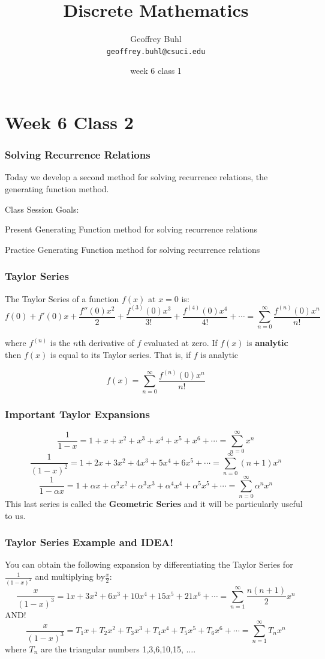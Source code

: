 \documentclass{beamer}
\title{Discrete Mathematics}
\author[Geoffrey Buhl]{Geoffrey Buhl \\ \texttt{geoffrey.buhl@csuci.edu}}
\institute[CSUCI]{California State University Channel Islands}
\date{week 6 class 1}
\newenvironment{packed_enum}{
\begin{enumerate}
  \setlength{\itemsep}{1pt}
  \setlength{\parskip}{0pt}
  \setlength{\parsep}{0pt}
}{\end{enumerate}}
\begin{document}


\section{Week 6 Class 2}

\frame
{
  \frametitle{Solving Recurrence Relations}

Today we develop a second method for solving recurrence relations, the generating function method.

\vfill
Class Session Goals:
\begin{packed_enum}
\item Present Generating Function method for solving recurrence relations
\item Practice Generating Function method for solving recurrence relations
\end{packed_enum}
\vfill
}

\frame
{
  \frametitle{Taylor Series}

The Taylor Series of a function $f(x)$ at $x=0$ is:\\

$$f(0)+f'(0)x+\frac{f''(0)x^2}{2}+\frac{f^{(3)}(0)x^3}{3!}+\frac{f^{(4)}(0)x^4}{4!}+ \cdots=\sum^{\infty}_{n=0}\frac{f^{(n)}(0)x^n}{n!}$$

where $f^{(n)}$ is the $n$th derivative of $f$ evaluated at zero.  If $f(x)$ is {\bf analytic} then $f(x)$ is equal to its Taylor series. That is, if $f$ is analytic

$$f(x)=\sum^{\infty}_{n=0}\frac{f^{(n)}(0)x^n}{n!}$$
}

\frame
{
  \frametitle{Important Taylor Expansions}


$$\frac{1}{1-x}=1+x+x^2+x^3+x^4+x^5+x^6+ \cdots=\sum_{n=0}^{\infty}x^n$$
$$\frac{1}{(1-x)^2}=1+2x+3x^2+4x^3+5x^4+6x^5+ \cdots=\sum_{n=0}^{\infty}(n+1)x^n$$
$$\frac{1}{1-\alpha x}=1+\alpha x+\alpha^2x^2+\alpha^3x^3+\alpha^4x^4+\alpha^5x^5+ \cdots=\sum_{n=0}^{\infty}\alpha^nx^n$$
 This last series is called the {\bf Geometric Series} and it will be particularly useful to us.

}

\frame
{
  \frametitle{Taylor Series Example and IDEA!}
You can obtain the following expansion by differentiating the Taylor Series for $\frac{1}{(1-x)^2}$ and multiplying by$\frac{x}{2}$:
$$\frac{x}{(1-x)^3}=1x+3x^2+6x^3+10x^4+15x^5+21x^6+ \cdots=\sum_{n=1}^{\infty}\frac{n(n+1)}{2}x^n$$
\pause AND!
$$\frac{x}{(1-x)^3}=T_1x+T_2x^2+T_3x^3+T_4x^4+T_5x^5+T_6x^6+ \cdots=\sum_{n=1}^{\infty}T_nx^n$$
where $T_n$ are the triangular numbers 1,3,6,10,15, $\ldots$.
}
\end{document}
